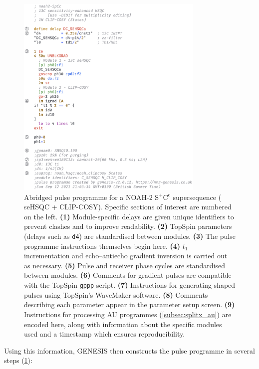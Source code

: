 \documentclass[a4paper,11pt]{article}
\newcommand{\carbon}{\ch{^{13}C}}
\begin{document}
\begin{refsection}
\begin{figure}
    \centering
    \includegraphics[width=0.8\textwidth]{pulprog_code.png}
    \caption{
        Abridged pulse programme for a NOAH-2 \(\mathrm{S^+C^c}\) supersequence (\carbon{} seHSQC + CLIP-COSY).
        Specific sections of interest are numbered on the left.
        \textbf{(1)} Module-specific delays are given unique identifiers to prevent clashes and to improve readability.
        \textbf{(2)} TopSpin parameters (delays such as \texttt{d4}) are standardised between modules.
        \textbf{(3)} The pulse programme instructions themselves begin here.
        \textbf{(4)} \(t_1\) incrementation and echo--antiecho gradient inversion is carried out as necessary.
        \textbf{(5)} Pulse and receiver phase cycles are standardised between modules.
        \textbf{(6)} Comments for gradient pulses are compatible with the TopSpin \texttt{gppp} script.
        \textbf{(7)} Instructions for generating shaped pulses using TopSpin's WaveMaker software.
        \textbf{(8)} Comments describing each parameter appear in the parameter setup screen.
        \textbf{(9)} Instructions for processing AU programmes (\cref{subsec:splitx_au}) are encoded here, along with information about the specific modules used and a timestamp which ensures reproducibility.
    }
    \label{fig:pulprog_code}
\end{figure}

Using this information, GENESIS then constructs the pulse programme in several steps (\cref{fig:pulprog_code}):


\end{refsection}
\end{document}
